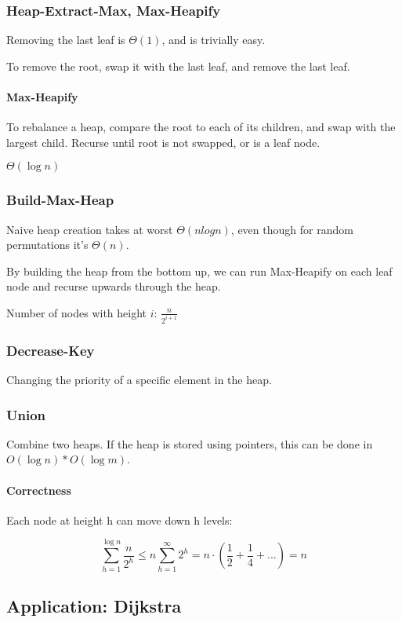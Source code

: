 \documentclass[a4paper]{article}
\begin{document}
\subsubsection{Heap-Extract-Max, Max-Heapify}
Removing the last leaf is $\Theta(1)$, and is trivially easy.

To remove the root, swap it with the last leaf, and remove the last leaf.

\paragraph{Max-Heapify}
To rebalance a heap, compare the root to each of its children, and swap with the largest child. Recurse until root is not swapped, or is a leaf node.

$\Theta(\log n)$

\subsubsection{Build-Max-Heap}
Naive heap creation takes at worst $\Theta(n log n)$, even though for random permutations it's $\Theta(n)$.

By building the heap from the bottom up, we can run Max-Heapify on each leaf node and recurse upwards through the heap.

Number of nodes with height $i$: $\frac{n}{2^{i+1}}$

\subsubsection{Decrease-Key}
Changing the priority of a specific element in the heap.

\subsubsection{Union}
Combine two heaps. If the heap is stored using pointers, this can be done in $O(\log n)*O(\log m)$.

\paragraph{Correctness}
Each node at height h can move down h levels:

\[\sum_{h=1}^{\log n} \frac{n}{2^h} \le n\sum_{h=1}^\infty 2^h=n\cdot(\frac{1}{2}+\frac{1}{4}+...)=n \]

\subsection{Application: Dijkstra}
\end{document}
